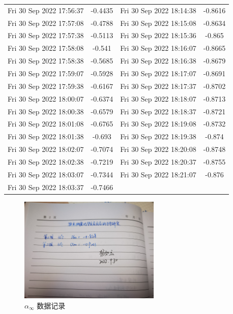 \documentclass[12pt]{ctexart}
\numberwithin{equation}{section}
\begin{document}
\begin{longtable}{cc|cc}
Fri 30 Sep 2022 17:56:37 & -0.4435 & Fri 30 Sep 2022 18:14:38 & -0.8616\\
Fri 30 Sep 2022 17:57:08 & -0.4788 & Fri 30 Sep 2022 18:15:08 & -0.8634\\
Fri 30 Sep 2022 17:57:38 & -0.5113 & Fri 30 Sep 2022 18:15:36 & -0.865\\
Fri 30 Sep 2022 17:58:08 & -0.541 & Fri 30 Sep 2022 18:16:07 & -0.8665\\
Fri 30 Sep 2022 17:58:38 & -0.5685 & Fri 30 Sep 2022 18:16:38 & -0.8679\\
Fri 30 Sep 2022 17:59:07 & -0.5928 & Fri 30 Sep 2022 18:17:07 & -0.8691\\
Fri 30 Sep 2022 17:59:38 & -0.6167 & Fri 30 Sep 2022 18:17:37 & -0.8702\\
Fri 30 Sep 2022 18:00:07 & -0.6374 & Fri 30 Sep 2022 18:18:07 & -0.8713\\
Fri 30 Sep 2022 18:00:38 & -0.6579 & Fri 30 Sep 2022 18:18:37 & -0.8721\\
Fri 30 Sep 2022 18:01:08 & -0.6765 & Fri 30 Sep 2022 18:19:08 & -0.8732\\
Fri 30 Sep 2022 18:01:38 & -0.693 & Fri 30 Sep 2022 18:19:38 & -0.874\\
Fri 30 Sep 2022 18:02:07 & -0.7074 & Fri 30 Sep 2022 18:20:08 & -0.8748\\
Fri 30 Sep 2022 18:02:38 & -0.7219 & Fri 30 Sep 2022 18:20:37 & -0.8755\\
Fri 30 Sep 2022 18:03:07 & -0.7344 & Fri 30 Sep 2022 18:21:07 & -0.876\\
Fri 30 Sep 2022 18:03:37 & -0.7466\\
    \hline
\end{longtable}

\begin{figure}[ht]
    \centering
    \includegraphics[width=0.6\textwidth]{原始数据.jpg}
    \caption{$\alpha_{\infty}$ 数据记录}
    \label{fig}
\end{figure}
\end{document}
